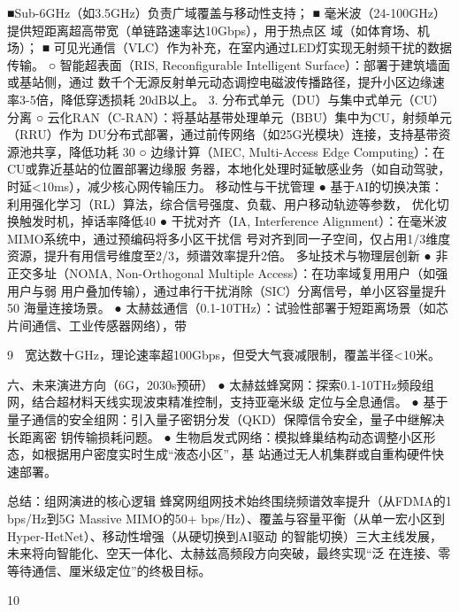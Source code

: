           ■Sub-6GHz（如3.5GHz）负责广域覆盖与移动性支持；
         ■ 毫米波（24-100GHz）提供短距离超高带宽（单链路速率达10Gbps），用于热点区
           域（如体育场、机场）；
         ■ 可见光通信（VLC）作为补充，在室内通过LED灯实现无射频干扰的数据传输。
      ○ 智能超表面（RIS, Reconfigurable Intelligent Surface）：部署于建筑墙面或基站侧，通过
        数千个无源反射单元动态调控电磁波传播路径，提升小区边缘速率3-5倍，降低穿透损耗
        20dB以上。
3.   分布式单元（DU）与集中式单元（CU）分离
      ○ 云化RAN（C-RAN）：将基站基带处理单元（BBU）集中为CU，射频单元（RRU）作为
        DU分布式部署，通过前传网络（如25G光模块）连接，支持基带资源池共享，降低功耗
        30%
      ○ 边缘计算（MEC, Multi-Access Edge Computing）：在CU或靠近基站的位置部署边缘服
        务器，本地化处理时延敏感业务（如自动驾驶，时延<10ms），减少核心网传输压力。
移动性与干扰管理
●    基于AI的切换决策：利用强化学习（RL）算法，综合信号强度、负载、用户移动轨迹等参数，
     优化切换触发时机，掉话率降低40%
●    干扰对齐（IA, Interference Alignment）：在毫米波MIMO系统中，通过预编码将多小区干扰信
     号对齐到同一子空间，仅占用1/3维度资源，提升有用信号维度至2/3，频谱效率提升2倍。
多址技术与物理层创新
●    非正交多址（NOMA, Non-Orthogonal Multiple Access）：在功率域复用用户（如强用户与弱
  用户叠加传输），通过串行干扰消除（SIC）分离信号，单小区容量提升50%
  海量连接场景。
● 太赫兹通信（0.1-10THz）：试验性部署于短距离场景（如芯片间通信、工业传感器网络），带



                                                                    9
    宽达数十GHz，理论速率超100Gbps，但受大气衰减限制，覆盖半径<10米。

六、未来演进方向（6G，2030s预研）
●   太赫兹蜂窝网：探索0.1-10THz频段组网，结合超材料天线实现波束精准控制，支持亚毫米级
    定位与全息通信。
●   基于量子通信的安全组网：引入量子密钥分发（QKD）保障信令安全，量子中继解决长距离密
  钥传输损耗问题。
● 生物启发式网络：模拟蜂巢结构动态调整小区形态，如根据用户密度实时生成“液态小区”，基
  站通过无人机集群或自重构硬件快速部署。

总结：组网演进的核心逻辑
蜂窝网组网技术始终围绕频谱效率提升（从FDMA的1 bps/Hz到5G Massive MIMO的50+
bps/Hz）、覆盖与容量平衡（从单一宏小区到Hyper-HetNet）、移动性增强（从硬切换到AI驱动
的智能切换）三大主线发展，未来将向智能化、空天一体化、太赫兹高频段方向突破，最终实现“泛
在连接、零等待通信、厘米级定位”的终极目标。




                                                   10
